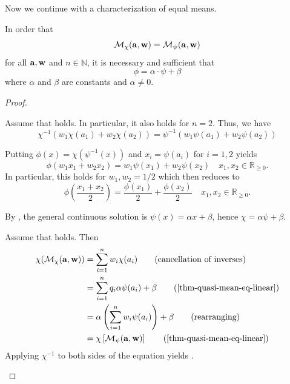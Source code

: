 Now we continue with a characterization of equal means.

\begin{thm} \label{thm-quasi-mean-equal-cond}
	In order that
  \begin{equation} \label{thm-quasi-mean-eq-equal}
    \mean[\chi]{\ve{a}}  = \mean[\psi]{\ve{a}}
  \end{equation}
	for all $\ve{a}, \ve{w}$ and $n \in \mathbb{N}$, it is necessary and sufficient that
  \begin{equation} \label{thm-quasi-mean-eq-linear}
		\phi = \alpha \cdot  \psi + \beta  \end{equation}
	where $\alpha$ and $\beta$ are constants and $\alpha \neq 0$.
\end{thm}

\begin{proof}

  \begin{proofpart}[$\Rightarrow$]
    Assume that  holds. In particular, it also holds for $n=2$.
    Thus, we have
    \begin{equation*}
      \chi^{-1}(w_1 \chi(a_1) + w_2 \chi(a_2)) = \psi^{-1} (w_1 \psi(a_1) + w_2 \psi (a_2))
    \end{equation*}

    Putting $\phi(x) = \chi ( \psi^{-1} (x))$ and $x_i = \psi (a_i)$ for $i=1, 2$ yields
    \begin{equation*}
      \phi(w_1 x_1 + w_2 x_2) = w_1 \psi(x_1) + w_2 \psi(x_2) \quad x_1, x_2 \in \mathbb{R}_{\geq  0}.
    \end{equation*}
    In particular, this holds for $w_1, w_2 = 1/2$ which then reduces to
    \begin{equation*}
      \phi \left (\frac{x_1 + x_2}{2}\right ) = \frac{\phi(x_1)}{2} + \frac{\phi (x_2)}{2} \quad x_1, x_2 \in \mathbb{R}_{\geq  0}.
    \end{equation*}

    By \textcite[p. 46]{aczel1966lectures}, the general continuous solution is $\psi(x) = \alpha x + \beta$, hence $\chi = \alpha \psi + \beta$.
  \end{proofpart}

  \begin{proofpart}[$\Leftarrow$]
    Assume that  holds.
    Then
    \begin{align*}
      \chi ( \mean[\chi]{\ve{a}}) &= \sum_{i=1}^{n} w_i \chi(a_i) \tag{cancellation of inverses} \\
                                  &= \sum_{i=1}^{n} q_i \alpha \psi(a_i) + \beta \tag{\cref{thm-quasi-mean-eq-linear}} \\
                                  &= \alpha \left ( \sum_{i=1}^{n} w_i \psi(a_i) \right ) + \beta \tag{rearranging} \\
                                  &= \chi \left [ \mean[\psi]{\ve{a}} \right] \tag{\cref{thm-quasi-mean-eq-linear}}
    \end{align*}
    Applying $\chi^{-1}$ to both sides of the equation yields .
  \end{proofpart}
\end{proof}

